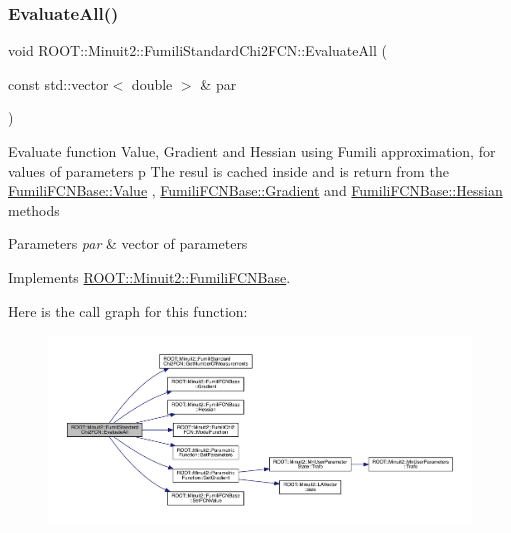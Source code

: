 \subsubsection{\texorpdfstring{EvaluateAll()}{EvaluateAll()}\hspace{0.1cm}{\footnotesize\ttfamily [2/2]}}
{\footnotesize\ttfamily void R\+O\+O\+T\+::\+Minuit2\+::\+Fumili\+Standard\+Chi2\+F\+C\+N\+::\+Evaluate\+All (\begin{DoxyParamCaption}\item[{const std\+::vector$<$ double $>$ \&}]{par }\end{DoxyParamCaption})\hspace{0.3cm}{\ttfamily [virtual]}}

Evaluate function Value, Gradient and Hessian using Fumili approximation, for values of parameters p The resul is cached inside and is return from the \mbox{\hyperlink{classROOT_1_1Minuit2_1_1FumiliFCNBase_a221dacee0ccde747a271a0cecd759f98}{Fumili\+F\+C\+N\+Base\+::\+Value}} , \mbox{\hyperlink{classROOT_1_1Minuit2_1_1FumiliFCNBase_ad226939ea2e83f754b5a6afc30876d3e}{Fumili\+F\+C\+N\+Base\+::\+Gradient}} and \mbox{\hyperlink{classROOT_1_1Minuit2_1_1FumiliFCNBase_ade134d8c6613393e942ef98d445db376}{Fumili\+F\+C\+N\+Base\+::\+Hessian}} methods


\begin{DoxyParams}{Parameters}
{\em par} & vector of parameters \\
\hline
\end{DoxyParams}


Implements \mbox{\hyperlink{classROOT_1_1Minuit2_1_1FumiliFCNBase_a0741bb4a7405cc33ab60583472a189cb}{R\+O\+O\+T\+::\+Minuit2\+::\+Fumili\+F\+C\+N\+Base}}.

Here is the call graph for this function\+:\nopagebreak
\begin{figure}[H]
\begin{center}
\leavevmode
\includegraphics[width=350pt]{d8/db2/classROOT_1_1Minuit2_1_1FumiliStandardChi2FCN_a76f42b6e5d2a92961a9fd8feca38b582_cgraph}
\end{center}
\end{figure}
\mbox{\label{classROOT_1_1Minuit2_1_1FumiliStandardChi2FCN_aed6181ee2996e090bc4aeb267771390e}} 
